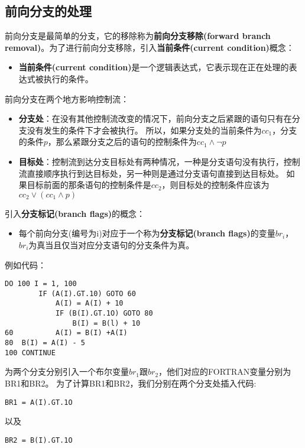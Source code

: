 \subsection{前向分支的处理}

前向分支是最简单的分支，它的移除称为\textbf{前向分支移除(forward branch removal)}。为了进行前向分支移除，引入\textbf{当前条件(current condition)}概念：

\begin{itemize}
\item \textbf{当前条件(current condition)}是一个逻辑表达式，它表示现在正在处理的表达式被执行的条件。
\end{itemize}

前向分支在两个地方影响控制流：

\begin{itemize}
\item \textbf{分支处}：在没有其他控制流改变的情况下，前向分支之后紧跟的语句只有在分支没有发生的条件下才会被执行。
所以，如果分支处的当前条件为$cc_1$，分支的条件$p$，那么紧跟分支之后的语句的控制条件为$cc_1\wedge \neg p$
\item \textbf{目标处}：控制流到达分支目标处有两种情况，一种是分支语句没有执行，控制流直接顺序执行到达目标处，另一种则是通过分支语句直接到达目标处。
如果目标前面的那条语句的控制条件是$cc_2$，则目标处的控制条件应该为$cc_2\vee \left(cc_1\wedge p\right)$
\end{itemize}

引入\textbf{分支标记(branch flags)}的概念：
\begin{itemize}
\item 每个前向分支(编号为i)对应于一个称为\textbf{分支标记(branch flags)}的变量$br_i$，$br_i$为真当且仅当对应分支语句的分支条件为真。
\end{itemize}

例如代码：

\begin{lstlisting}[language=FORTRAN]
	DO 100 I = 1, 100
		IF (A(I).GT.10) GOTO 60
			A(I) = A(I) + 10
			IF (B(I).GT.1O) GOTO 80
				B(I) = B(l) + 10
60			A(I) = B(I) +A(I)
80	B(I) = A(I) - 5
100	CONTINUE 
\end{lstlisting}

为两个分支分别引入一个布尔变量$br_1$跟$br_2$，他们对应的FORTRAN变量分别为BR1和BR2。
为了计算BR1和BR2，我们分别在两个分支处插入代码:
\begin{lstlisting}[language=FORTRAN]
BR1 = A(I).GT.1O
\end{lstlisting}
以及
\begin{lstlisting}[language=FORTRAN]
BR2 = B(I).GT.1O
\end{lstlisting}

